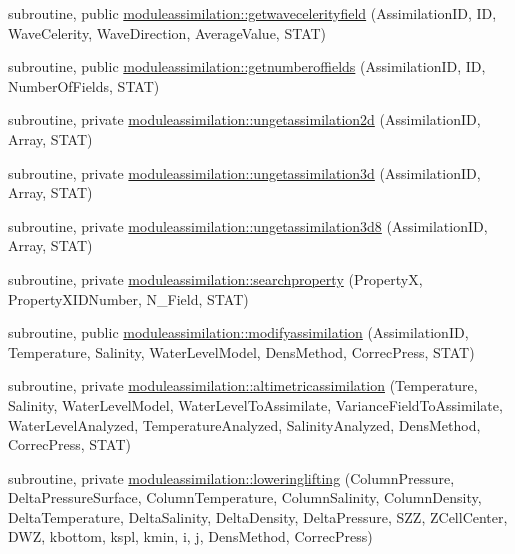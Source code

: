 \begin{DoxyCompactItemize}
\item 
subroutine, public \mbox{\hyperlink{namespacemoduleassimilation_ae45ed729fac9768fcf97b5c5262c471a}{moduleassimilation\+::getwavecelerityfield}} (Assimilation\+ID, ID, Wave\+Celerity, Wave\+Direction, Average\+Value, S\+T\+AT)
\item 
subroutine, public \mbox{\hyperlink{namespacemoduleassimilation_aea7807de0a1c100aea360d7f4a30e2e5}{moduleassimilation\+::getnumberoffields}} (Assimilation\+ID, ID, Number\+Of\+Fields, S\+T\+AT)
\item 
subroutine, private \mbox{\hyperlink{namespacemoduleassimilation_a3a9adb0b25404594ea0591b684a7c40e}{moduleassimilation\+::ungetassimilation2d}} (Assimilation\+ID, Array, S\+T\+AT)
\item 
subroutine, private \mbox{\hyperlink{namespacemoduleassimilation_a73155621f7e95b5f4757f4efd48fee01}{moduleassimilation\+::ungetassimilation3d}} (Assimilation\+ID, Array, S\+T\+AT)
\item 
subroutine, private \mbox{\hyperlink{namespacemoduleassimilation_a06544a43532e67f29e5ac264d6870860}{moduleassimilation\+::ungetassimilation3d8}} (Assimilation\+ID, Array, S\+T\+AT)
\item 
subroutine, private \mbox{\hyperlink{namespacemoduleassimilation_a25c18cab5d2d7615f696e5f0ebfbada0}{moduleassimilation\+::searchproperty}} (PropertyX, Property\+X\+I\+D\+Number, N\+\_\+\+Field, S\+T\+AT)
\item 
subroutine, public \mbox{\hyperlink{namespacemoduleassimilation_a5932eaba41c6bd73ade2cb009b3824e8}{moduleassimilation\+::modifyassimilation}} (Assimilation\+ID, Temperature, Salinity, Water\+Level\+Model, Dens\+Method, Correc\+Press, S\+T\+AT)
\item 
subroutine, private \mbox{\hyperlink{namespacemoduleassimilation_af392c1f06d8b730776cfb5680aaf95cb}{moduleassimilation\+::altimetricassimilation}} (Temperature, Salinity, Water\+Level\+Model, Water\+Level\+To\+Assimilate, Variance\+Field\+To\+Assimilate, Water\+Level\+Analyzed, Temperature\+Analyzed, Salinity\+Analyzed, Dens\+Method, Correc\+Press, S\+T\+AT)
\item 
subroutine, private \mbox{\hyperlink{namespacemoduleassimilation_adb4698b9b7aa680222581e31452094dc}{moduleassimilation\+::loweringlifting}} (Column\+Pressure, Delta\+Pressure\+Surface, Column\+Temperature, Column\+Salinity, Column\+Density, Delta\+Temperature, Delta\+Salinity, Delta\+Density, Delta\+Pressure, S\+ZZ, Z\+Cell\+Center, D\+WZ, kbottom, kspl, kmin, i, j, Dens\+Method, Correc\+Press)
\item 

\end{DoxyCompactItemize}
